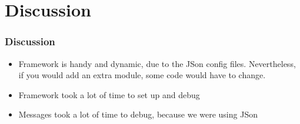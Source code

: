 \documentclass{beamer}
\begin{document}
{
      \begin{frame}
      \end{frame}
}
{
      \begin{frame}
      \end{frame}
}

\section{Discussion}
\begin{frame}
\frametitle{Discussion}
\begin{itemize}
\item Framework is handy and dynamic, due to the JSon config files.
Nevertheless, if you would add an extra module, some code would have to change.
\item Framework took a lot of time to set up and debug
\item Messages took a lot of time to debug, because we were using JSon
\end{itemize}
\end{frame}
\end{document}
